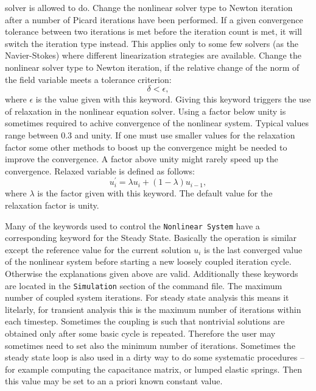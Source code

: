 solver is allowed to do.
%
Change the nonlinear solver type to
Newton iteration after a number of Picard iterations have been performed. If a given
convergence tolerance between two iterations is met before the iteration count is met,
it will switch the iteration type instead. This applies only to some few solvers (as the Navier-Stokes)
where different linearization strategies are available.
%
Change the nonlinear solver type to
Newton iteration, if the relative change of the norm of the field variable meets a
tolerance criterion:
$$
 \delta < \epsilon,
$$
where $\epsilon$ is the value given with this keyword.
%
Giving this keyword triggers the use
of relaxation in the nonlinear equation solver.
Using a factor below unity is sometimes required to achive convergence of the nonlinear system.
Typical values range between 0.3 and unity. If one must use smaller values for the relaxation
factor some other methods to boost up the convergence might be needed to improve the convergence.
A factor above unity might rarely speed up the convergence. Relaxed variable is defined as follows:
$$
 u^{'}_i = \lambda u_i + (1-\lambda) u_{i-1},
$$
where $\lambda$ is the factor given with this keyword. The default value for the relaxation factor
is unity. 
%
\sifend


Many of the keywords used to control the \texttt{Nonlinear System} have a corresponding 
keyword for the {Steady State}. Basically the operation is similar except the 
reference value for the current solution $u_i$ is the last converged value of the nonlinear system
before starting a new loosely coupled iteration cycle. Otherwise the explanations given above are valid.
\sifbegin
{} 
\sifend 
Additionally these keywords are located in the \texttt{Simulation} section
of the command file.
\sifbegin
{}
The maximum number of coupled system iterations. For steady state analysis this means
it litelarly, for transient analysis this is the maximum number of iterations within each timestep.
%
Sometimes the coupling is such that nontrivial solutions are obtained only after some basic
cycle is repeated. Therefore the user may sometimes need to set also the minimum number of
iterations. Sometimes the steady state loop is also used in a dirty way to do some 
systematic procedures -- for example computing the capacitance matrix, or lumped elastic springs.
Then this value may be set to an a priori known constant value.
\sifend


\begin{versiona}


\end{versiona}

